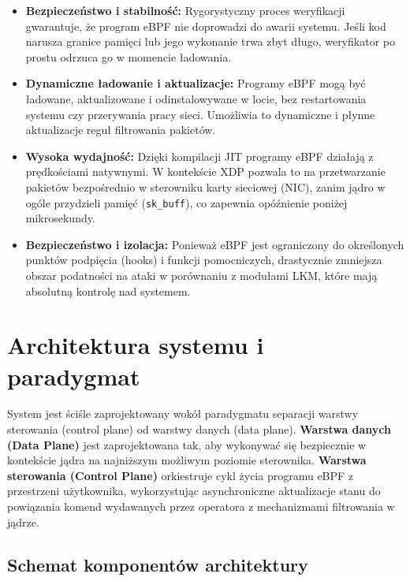 \documentclass[11pt,a4paper]{article}
\begin{document}
\begin{itemize}
    \item \textbf{Bezpieczeństwo i stabilność:} Rygorystyczny proces weryfikacji gwarantuje, że program eBPF nie doprowadzi do awarii systemu. Jeśli kod narusza granice pamięci lub jego wykonanie trwa zbyt długo, weryfikator po prostu odrzuca go w momencie ładowania.
    \item \textbf{Dynamiczne ładowanie i aktualizacje:} Programy eBPF mogą być ładowane, aktualizowane i odinstalowywane w locie, bez restartowania systemu czy przerywania pracy sieci. Umożliwia to dynamiczne i płynne aktualizacje reguł filtrowania pakietów.
    \item \textbf{Wysoka wydajność:} Dzięki kompilacji JIT programy eBPF działają z prędkościami natywnymi. W kontekście XDP pozwala to na przetwarzanie pakietów bezpośrednio w sterowniku karty sieciowej (NIC), zanim jądro w ogóle przydzieli pamięć (\texttt{sk\_buff}), co zapewnia opóźnienie poniżej mikrosekundy.
    \item \textbf{Bezpieczeństwo i izolacja:} Ponieważ eBPF jest ograniczony do określonych punktów podpięcia (hooks) i funkcji pomocniczych, drastycznie zmniejsza obszar podatności na ataki w porównaniu z modułami LKM, które mają absolutną kontrolę nad systemem.
\end{itemize}

\section{Architektura systemu i paradygmat}

System jest ściśle zaprojektowany wokół paradygmatu separacji warstwy sterowania (control plane) od warstwy danych (data plane). \textbf{Warstwa danych (Data Plane)} jest zaprojektowana tak, aby wykonywać się bezpiecznie w kontekście jądra na najniższym możliwym poziomie sterownika. \textbf{Warstwa sterowania (Control Plane)} orkiestruje cykl życia programu eBPF z przestrzeni użytkownika, wykorzystując asynchroniczne aktualizacje stanu do powiązania komend wydawanych przez operatora z mechanizmami filtrowania w jądrze.

\subsection{Schemat komponentów architektury}
\end{document}
